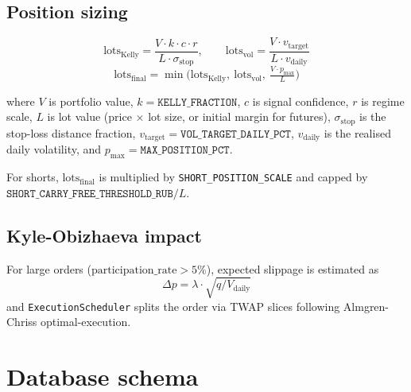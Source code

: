 \documentclass[11pt,a4paper]{article}
\begin{document}
\subsection{Position sizing}

\[
\text{lots}_{\text{Kelly}} = \frac{V \cdot k \cdot c \cdot r}{L \cdot \sigma_{\text{stop}}},\qquad
\text{lots}_{\text{vol}} = \frac{V \cdot v_{\text{target}}}{L \cdot v_{\text{daily}}}
\]
\[
\text{lots}_{\text{final}} = \min\!\bigl(\text{lots}_{\text{Kelly}},\ \text{lots}_{\text{vol}},\ \tfrac{V \cdot p_{\max}}{L}\bigr)
\]

where $V$ is portfolio value, $k = \texttt{KELLY\_FRACTION}$,
$c$ is signal confidence, $r$ is regime scale,
$L$ is lot value (price $\times$ lot size, or initial margin for
futures), $\sigma_{\text{stop}}$ is the stop-loss distance fraction,
$v_{\text{target}} = \texttt{VOL\_TARGET\_DAILY\_PCT}$, $v_{\text{daily}}$
is the realised daily volatility, and $p_{\max} = \texttt{MAX\_POSITION\_PCT}$.

For shorts, $\text{lots}_{\text{final}}$ is multiplied by
\texttt{SHORT\_POSITION\_SCALE} and capped by
$\texttt{SHORT\_CARRY\_FREE\_THRESHOLD\_RUB} / L$.

\subsection{Kyle-Obizhaeva impact}

For large orders ($\text{participation\_rate} > 5\%$), expected slippage
is estimated as
\[
\Delta p = \lambda \cdot \sqrt{q / V_{\text{daily}}}
\]
and \texttt{ExecutionScheduler} splits the order via TWAP slices following
Almgren-Chriss optimal-execution.

\newpage
\section{Database schema}
\end{document}
